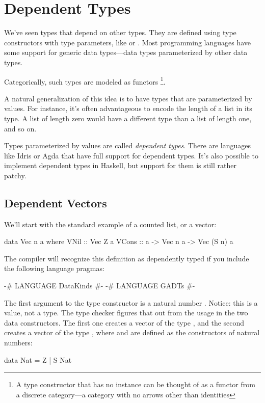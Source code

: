 \documentclass[DaoFP]{subfiles}
\begin{document}
\setcounter{chapter}{10}

\chapter{Dependent Types}

We've seen types that depend on other types. They are defined using type constructors with type parameters, like  or \hask{[]}. Most programming languages have some support for generic data types---data types parameterized by other data types.

Categorically, such types are modeled as functors \footnote{A type constructor that has no  instance can be thought of as a functor from a discrete category---a category with no arrows other than identities}.

A natural generalization of this idea is to have types that are parameterized by values. For instance, it's often advantageous to encode the length of a list in its type. A list of length zero would have a different type than a list of length one, and so on. 

Types parameterized by values are called \emph{dependent types}. There are languages like Idris or Agda that have full support for dependent types. It's also possible to implement dependent types in Haskell, but support for them is still rather patchy.

\section{Dependent Vectors}

We'll start with the standard example of a counted list, or a vector:
\begin{haskell}
data Vec n a where
    VNil  :: Vec Z a
    VCons :: a -> Vec n a -> Vec (S n) a
\end{haskell}
The compiler will recognize this definition as dependently typed if you include the following language pragmas:
\begin{haskell}
{-# LANGUAGE DataKinds #-}
{-# LANGUAGE GADTs #-}
\end{haskell}
The first argument to the type constructor is a natural number . Notice: this is a value, not a type. The type checker figures that out from the usage in the two data constructors. The first one creates a vector of the type , and the second creates a vector of the type , where  and  are defined as the constructors of natural numbers:
\begin{haskell}
data Nat = Z | S Nat
\end{haskell}
\end{document}
